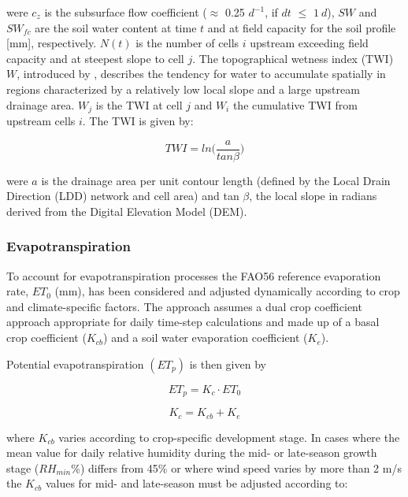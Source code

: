 \documentclass[]{article}
\begin{document}
were \(c_z\) is the subsurface flow coefficient (\(\approx\) 0.25
\(d^{-1}\), if \(dt\) \(\leq\) \(1~d\)), \(SW\) and \(SW_{fc}\) are the
soil water content at time \(t\) and at field capacity for the soil
profile {[}mm{]}, respectively. \(N(t)\) is the number of cells \(i\)
upstream exceeding field capacity and at steepest slope to cell \(j\).
The topographical wetness index (TWI) \(W\), introduced by
\cite{Beven1979}, describes the tendency for water to accumulate
spatially in regions characterized by a relatively low local slope and a
large upstream drainage area. \(W_j\) is the TWI at cell \(j\) and
\(W_i\) the cumulative TWI from upstream cells \(i\). The TWI is given
by:

\begin{equation}
TWI =ln\Big(\frac{a}{tan \beta} \Big)
\label{eq:Wz}  
\end{equation}

were \(a\) is the drainage area per unit contour length (defined by the
Local Drain Direction (LDD) network and cell area) and tan \(\beta\),
the local slope in radians derived from the Digital Elevation Model
(DEM).

\hypertarget{evapotranspiration}{%
\subsubsection{Evapotranspiration}\label{evapotranspiration}}

To account for evapotranspiration processes the FAO56 reference
evaporation rate, \(ET_0\) (mm), has been considered and adjusted
dynamically according to crop and climate-specific factors. The approach
assumes a dual crop coefficient approach appropriate for daily time-step
calculations \citep{Allen1998} and made up of a basal crop coefficient
(\(K_{cb}\)) and a soil water evaporation coefficient (\(K_e\)).

Potential evapotranspiration \((ET_p)\) is then given by

\begin{equation}
ET_p=K_c \cdot ET_0
\label{eq:ETp}  
\end{equation}

\begin{equation}
K_c = K_{cb} + K_e
\label{eq:Kc}  
\end{equation}

where \(K_{cb}\) varies according to crop-specific development stage. In
cases where the mean value for daily relative humidity during the mid-
or late-season growth stage (\(RH_{min}\)\%) differs from 45\% or where
wind speed varies by more than 2 m/s the \(K_{cb}\) values for mid- and
late-season must be adjusted according to:
\end{document}
